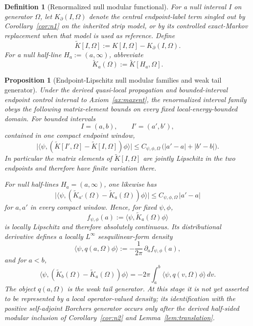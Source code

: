\documentclass[11pt]{article}
\newtheorem{proposition}[theorem]{Proposition}
\newtheorem{definition}[theorem]{Definition}
\begin{document}
\begin{definition}[Renormalized null modular functional]
For a null interval \(I\) on generator \(\Omega\), let \(K_\partial(I,\Omega)\) denote the central endpoint-label term singled out by Corollary~\ref{cor:n1} on the inherited strip model, or by its controlled exact-Markov replacement when that model is used as reference. Define
\[
\widetilde K[I,\Omega]
:=
K[I,\Omega]-K_\partial(I,\Omega).
\]
For a null half-line \(H_a:=(a,\infty)\), abbreviate
\[
\widetilde K_a(\Omega):=\widetilde K[H_a,\Omega].
\]
\end{definition}

\begin{proposition}[Endpoint-Lipschitz null modular families and weak tail generator]\label{prop:n3}
Under the derived quasi-local propagation and bounded-interval endpoint control internal to Axiom~\ref{ax:maxent}, the renormalized interval family obeys the following matrix-element bounds on every fixed local-energy-bounded domain. For bounded intervals
\[
I=(a,b),\qquad
I'=(a',b'),
\]
contained in one compact endpoint window,
\[
\bigl|\langle \psi,(\widetilde K[I',\Omega]-\widetilde K[I,\Omega])\phi\rangle\bigr|
\le
C_{\psi,\phi,\Omega}\,\bigl(|a'-a|+|b'-b|\bigr).
\]
In particular the matrix elements of \(\widetilde K[I,\Omega]\) are jointly Lipschitz in the two endpoints and therefore have finite variation there.

For null half-lines \(H_a=(a,\infty)\), one likewise has
\[
\bigl|\langle \psi,(\widetilde K_{a'}(\Omega)-\widetilde K_a(\Omega))\phi\rangle\bigr|
\le
C_{\psi,\phi,\Omega}\,|a'-a|
\]
for \(a,a'\) in every compact window. Hence, for fixed \(\psi,\phi\),
\[
f_{\psi,\phi}(a):=\langle\psi,\widetilde K_a(\Omega)\phi\rangle
\]
is locally Lipschitz and therefore absolutely continuous. Its distributional derivative defines a locally \(L^\infty\) sesquilinear-form density
\[
\langle\psi,q(a,\Omega)\phi\rangle
:=
-\frac{1}{2\pi}\,\partial_a f_{\psi,\phi}(a),
\]
and for \(a<b\),
\[
\langle\psi,(\widetilde K_b(\Omega)-\widetilde K_a(\Omega))\phi\rangle
=
-2\pi\int_a^b \langle\psi,q(v,\Omega)\phi\rangle\,dv.
\]
The object \(q(a,\Omega)\) is the weak tail generator. At this stage it is not yet asserted to be represented by a local operator-valued density; its identification with the positive self-adjoint Borchers generator occurs only after the derived half-sided modular inclusion of Corollary~\ref{cor:n2} and Lemma~\ref{lem:translation}.
\end{proposition}
\end{document}
